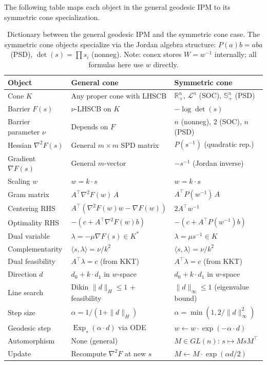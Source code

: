 \documentclass[11pt]{article}
\newcommand{\R}{\mathbb{R}}
\newcommand{\ip}[2]{\langle #1, #2 \rangle}
\DeclareMathOperator{\Exp}{Exp}
\begin{document}
The following table maps each object in the general geodesic IPM to its
symmetric cone specialization.

\begin{table}[h]
\centering
\renewcommand{\arraystretch}{1.3}
\begin{tabular}{@{}lll@{}}
\toprule
\textbf{Object} & \textbf{General cone} & \textbf{Symmetric cone} \\
\midrule
Cone $K$ & Any proper cone with LHSCB & $\R^n_+$, $\mathcal{L}^n$ (SOC), $\mathbb{S}^n_+$ (PSD) \\
Barrier $F(s)$ & $\nu$-LHSCB on $K$ & $-\log\det(s)$ \\
Barrier parameter $\nu$ & Depends on $F$ & $n$ (nonneg), $2$ (SOC), $n$ (PSD) \\
Hessian $\nabla^2 F(s)$ & General $m \times m$ SPD matrix & $P(s^{-1})$ (quadratic rep.) \\
Gradient $\nabla F(s)$ & General $m$-vector & $-s^{-1}$ (Jordan inverse) \\
\midrule
Scaling $w$ & $w = k \cdot s$ & $w = k \cdot s$ \\
Gram matrix & $A^\top \nabla^2 F(w) \, A$ & $A^\top P(w^{-1}) \, A$ \\
Centering RHS & $A^\top(\nabla^2 F(w)w - \nabla F(w))$ & $2A^\top w^{-1}$ \\
Optimality RHS & $-(c + A^\top \nabla^2 F(w) b)$ & $-(c + A^\top P(w^{-1}) b)$ \\
\midrule
Dual variable & $\lambda = -\mu \nabla F(s) \in K^*$ & $\lambda = \mu s^{-1} \in K$ \\
Complementarity & $\ip{s}{\lambda} = \nu / k^2$ & $\ip{s}{\lambda} = \nu / k^2$ \\
Dual feasibility & $A^\top \lambda = c$ (from KKT) & $A^\top \lambda = c$ (from KKT) \\
\midrule
Direction $d$ & $d_0 + k \cdot d_1$ in $w$-space & $d_0 + k \cdot d_1$ in $w$-space \\
Line search & Dikin $\|d\|_H \leq 1$ + feasibility & $\|d\|_\infty \leq 1$ (eigenvalue bound) \\
Step size & $\alpha = 1/(1 + \|d\|_H)$ & $\alpha = \min(1, 2/\|d\|_\infty^2)$ \\
\midrule
Geodesic step & $\Exp_s(\alpha \cdot d)$ via ODE & $w \gets w \cdot \exp(-\alpha \cdot d)$ \\
Automorphism & None (general) & $M \in GL(n)$: $s \mapsto MsM^\top$ \\
Update & Recompute $\nabla^2 F$ at new $s$ & $M \gets M \cdot \exp(\alpha d / 2)$ \\
\bottomrule
\end{tabular}
\caption{Dictionary between the general geodesic IPM and the symmetric cone case.
The symmetric cone objects specialize via the Jordan algebra structure:
$P(a)b = aba$ (PSD), $\det(s) = \prod s_i$ (nonneg).
Note: conex stores $W = w^{-1}$ internally; all formulas here use $w$ directly.}
\label{tab:dictionary}
\end{table}
\end{document}

